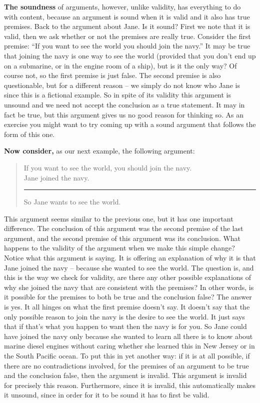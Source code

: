 \documentclass[]{book}
\newenvironment{argument}{\begin{quote}\normalsize}{\end{quote}}
\begin{document}
\textbf{The soundness} of arguments, however, unlike validity, has everything to do with content, because an argument is sound when it is valid and it also has true premises. Back to the argument about Jane. Is it sound? First we note that it is valid, then we ask whether or not the premises are really true. Consider the first premise: ``If you want to see the world you should join the navy.'' It may be true that joining the navy is one way to see the world (provided that you don't end up on a submarine, or in the engine room of a ship), but is it the only way? Of course not, so the first premise is just false. The second premise is also questionable, but for a different reason -- we simply do not know who Jane is since this is a fictional example. So in spite of its validity this argument is unsound and we need not accept the conclusion as a true statement. It may in fact be true, but this argument gives us no good reason for thinking so. As an exercise you might want to try coming up with a sound argument that follows the form of this one.

\textbf{Now consider,} as our next example, the following argument:

\begin{argument}
If you want to see the world, you should join the navy.\\
Jane joined the navy.\\

\begin{center}\rule{0.5\linewidth}{\linethickness}\end{center}

So Jane wants to see the world.
\end{argument}

This argument seems similar to the previous one, but it has one important difference. The conclusion of this argument was the second premise of the last argument, and the second premise of this argument was its conclusion. What happens to the validity of the argument when we make this simple change? Notice what this argument is saying. It is offering an explanation of why it is that Jane joined the navy -- because she wanted to see the world. The question is, and this is the way we check for validity, are there any other possible explanations of why she joined the navy that are consistent with the premises? In other words, is it possible for the premises to both be true and the conclusion false? The answer is yes. It all hinges on what the first premise doesn't say. It doesn't say that the only possible reason to join the navy is the desire to see the world. It just says that if that's what you happen to want then the navy is for you. So Jane could have joined the navy only because she wanted to learn all there is to know about marine diesel engines without caring whether she learned this in New Jersey or in the South Pacific ocean. To put this in yet another way: if it is at all possible, if there are no contradictions involved, for the premises of an argument to be true and the conclusion false, then the argument is invalid. This argument is invalid for precisely this reason. Furthermore, since it is invalid, this automatically makes it unsound, since in order for it to be sound it has to first be valid.
\end{document}
